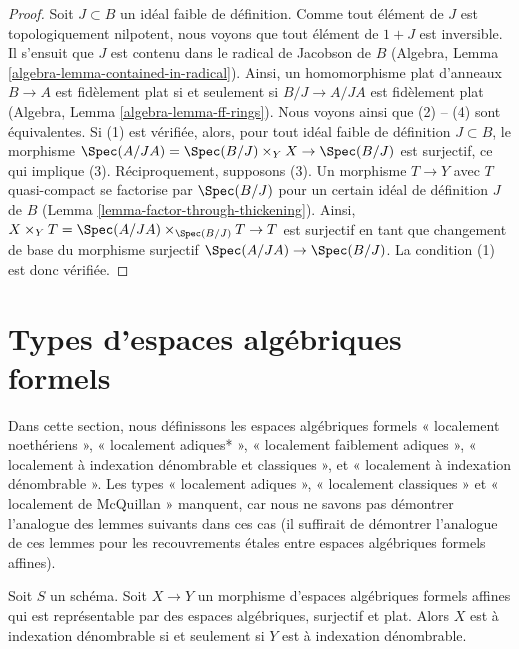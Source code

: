\begin{proof}
Soit $J \subset B$ un idéal faible de définition. Comme tout élément de $J$
est topologiquement nilpotent, nous voyons que tout élément de $1 + J$ est
inversible. Il s'ensuit que $J$ est contenu dans le radical de Jacobson de $B$
(Algebra, Lemma \ref{algebra-lemma-contained-in-radical}).
Ainsi, un homomorphisme plat d'anneaux $B \to A$ est fidèlement plat si et seulement si
$B/J \to A/JA$ est fidèlement plat
(Algebra, Lemma \ref{algebra-lemma-ff-rings}).
Nous voyons ainsi que (2) -- (4) sont équivalentes.
Si (1) est vérifiée, alors, pour tout idéal faible de définition $J \subset B$,
le morphisme
$\Spec(A/JA) = \Spec(B/J) \times_Y X \to \Spec(B/J)$ est surjectif,
ce qui implique (3). Réciproquement, supposons (3).
Un morphisme $T \to Y$ avec $T$ quasi-compact
se factorise par $\Spec(B/J)$ pour un certain idéal de définition $J$ de $B$
(Lemma \ref{lemma-factor-through-thickening}).
Ainsi, $X \times_Y T = \Spec(A/JA) \times_{\Spec(B/J)} T \to T$
est surjectif en tant que changement de base du morphisme surjectif
$\Spec(A/JA) \to \Spec(B/J)$. La condition (1) est donc vérifiée.
\end{proof}





\section{Types d'espaces algébriques formels}
\label{section-types}

\noindent
Dans cette section, nous définissons
les espaces algébriques formels
« localement noethériens »,
« localement adiques* »,
« localement faiblement adiques »,
« localement à indexation dénombrable et classiques », et
« localement à indexation dénombrable ».
Les types « localement adiques »,
« localement classiques » et
« localement de McQuillan »
manquent, car nous ne savons pas démontrer l'analogue des lemmes suivants
dans ces cas (il suffirait de démontrer l'analogue de ces
lemmes pour les recouvrements étales entre espaces algébriques formels affines).

\begin{lemma}
\label{lemma-iff-countably-indexed}
Soit $S$ un schéma. Soit $X \to Y$ un morphisme d'espaces algébriques
formels affines qui est représentable par des espaces algébriques,
surjectif et plat. Alors $X$ est à indexation dénombrable si et seulement
si $Y$ est à indexation dénombrable.
\end{lemma}

